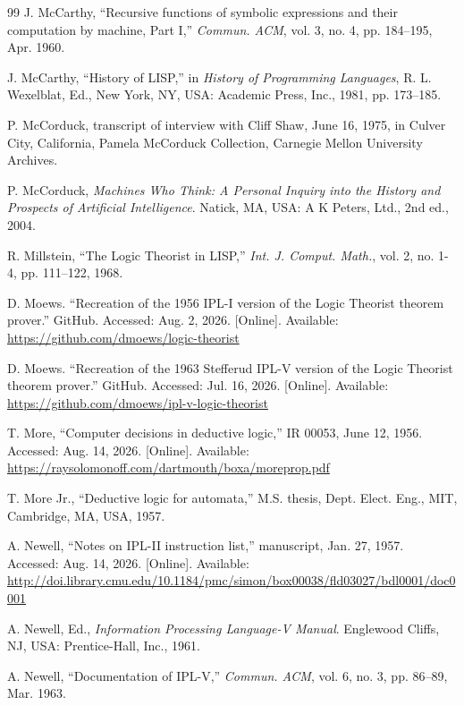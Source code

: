 \documentclass{IEEEcsmag}
\begin{document}
\begin{thebibliography}{99}
 J. McCarthy, ``Recursive functions of
  symbolic expressions and their computation by machine, Part I,''
  \textit{Commun. ACM}, vol. 3, no. 4, pp. 184--195, Apr. 1960.

 J. McCarthy, ``History of LISP,'' in
  \textit{History of Programming Languages}, R. L. Wexelblat, Ed.,
  New York, NY, USA: Academic Press, Inc., 1981, pp. 173--185.

 P. McCorduck, transcript of interview
  with Cliff Shaw, June 16, 1975, in Culver City, California,
  Pamela McCorduck Collection, Carnegie Mellon University Archives.

 P. McCorduck, \textit{Machines Who
  Think: A Personal Inquiry into the History and Prospects
  of Artificial Intelligence}. Natick, MA, USA: A K Peters, Ltd., 2nd ed., 2004.

 R. Millstein, ``The Logic Theorist in
  LISP,'' \textit{Int. J. Comput. Math.},
  vol. 2, no. 1-4, pp. 111--122, 1968.

 D. Moews.
  ``Recreation of the 1956 IPL-I version of the Logic Theorist theorem
  prover.''
  GitHub.
  Accessed: Aug. 2, 2026.  [Online].
  Available: \url{https://github.com/dmoews/logic-theorist}

 D. Moews.
  ``Recreation of the 1963 Stefferud IPL-V version of the Logic Theorist
  theorem prover.''
  GitHub.
  Accessed: Jul. 16, 2026.  [Online].
  Available: \url{https://github.com/dmoews/ipl-v-logic-theorist}

 T. More,
  ``Computer decisions in deductive logic,'' IR 00053, June 12, 1956.
  Accessed: Aug. 14, 2026.  [Online].
  Available: \url{https://raysolomonoff.com/dartmouth/boxa/moreprop.pdf}

 T. More Jr., ``Deductive logic for automata,''
  M.S. thesis,
  Dept. Elect. Eng., MIT, Cambridge, MA, USA, 1957.

 A. Newell, ``Notes on IPL-II instruction list,''
  manuscript, Jan. 27, 1957.
  Accessed: Aug. 14, 2026.  [Online].
  Available: \url{http://doi.library.cmu.edu/10.1184/pmc/simon/box00038/fld03027/bdl0001/doc0001}

 A. Newell, Ed., \textit{Information
  Processing Language-V Manual}. Englewood Cliffs, NJ, USA:
  Prentice-Hall, Inc., 1961.

 A. Newell, ``Documentation of IPL-V,''
  \textit{Commun. ACM}, vol. 6, no. 3, pp. 86--89, Mar. 1963.


\end{thebibliography}
\end{document}
